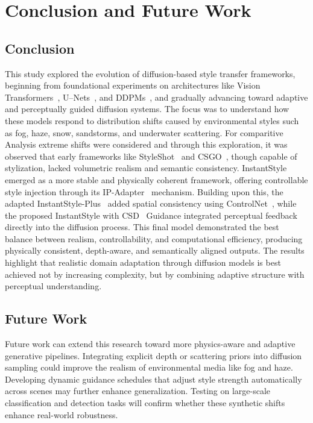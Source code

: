 \chapter{Conclusion and Future Work}
\label{chap:conclusion_future}

\section{Conclusion}
This study explored the evolution of diffusion-based style transfer frameworks, beginning from foundational experiments on architectures like Vision Transformers~\cite{dosovitskiy2020vit}, U–Nets~\cite{ronneberger2015unet}, and DDPMs~\cite{ho2020ddpm}, and gradually advancing toward adaptive and perceptually guided diffusion systems. The focus was to understand how these models respond to distribution shifts caused by environmental styles such as fog, haze, snow, sandstorms, and underwater scattering.
For comparitive Analysis extreme shifts were considered and through this exploration, it was observed that early frameworks like StyleShot~\cite{gao2024styleshot} and CSGO~\cite{xing2024csgocomp}, though capable of stylization, lacked volumetric realism and semantic consistency. InstantStyle~\cite{wang2024instantstyle} emerged as a more stable and physically coherent framework, offering controllable style injection through its IP-Adapter~\cite{chen2023ipadapter} mechanism. Building upon this, the adapted InstantStyle-Plus~\cite{wang2024instantstyleplus} added spatial consistency using ControlNet~\cite{zhang2023controlnet}, while the proposed InstantStyle with CSD~\cite{somepalli2024csd} Guidance integrated perceptual feedback directly into the diffusion process. This final model demonstrated the best balance between realism, controllability, and computational efficiency, producing physically consistent, depth-aware, and semantically aligned outputs. The results highlight that realistic domain adaptation through diffusion models is best achieved not by increasing complexity, but by combining adaptive structure with perceptual understanding.

\section{Future Work}
Future work can extend this research toward more physics-aware and adaptive generative pipelines. Integrating explicit depth or scattering priors into diffusion sampling could improve the realism of environmental media like fog and haze. Developing dynamic guidance schedules that adjust style strength automatically across scenes may further enhance generalization. Testing on large-scale classification and detection tasks will confirm whether these synthetic shifts enhance real-world robustness.
